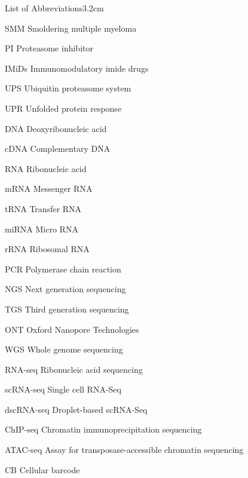 \begin{mclistof}{List of Abbreviations}{3.2cm}
\item[SMM] Smoldering multiple myeloma

\item[PI] Proteasome inhibitor

\item[IMiDs] Immunomodulatory imide drugs

\item[UPS] Ubiquitin proteasome system

\item[UPR] Unfolded protein response

\item[DNA] Deoxyribonucleic acid

\item[cDNA] Complementary DNA

\item[RNA] Ribonucleic acid

\item[mRNA] Messenger RNA

\item[tRNA] Transfer RNA

\item[miRNA] Micro RNA

\item[rRNA] Ribosomal RNA

\item[PCR] Polymerase chain reaction

\item[NGS] Next generation sequencing

\item[TGS] Third generation sequencing

\item[ONT] Oxford Nanopore Technologies

\item[WGS] Whole genome sequencing

\item[RNA-seq] Ribonucleic acid sequencing

\item[scRNA-seq] Single cell RNA-Seq

\item[dscRNA-seq] Droplet-based scRNA-Seq

\item[ChIP-seq] Chromatin immunoprecipitation sequencing

\item[ATAC-seq] Assay for transposase-accessible chromatin sequencing

\item[CB] Cellular barcode


\end{mclistof}
